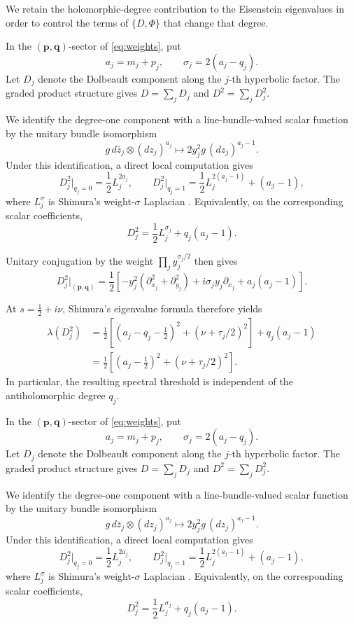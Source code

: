 \documentclass[11pt]{article}
\theoremstyle{definition}
\theoremstyle{plain}
\numberwithin{equation}{section}
\begin{document}
We retain the holomorphic-degree contribution to the Eisenstein
eigenvalues in order to control the terms of $\{D,\Phi\}$ that
change that degree.


In the $(\boldsymbol p,\boldsymbol q)$-sector of
\eqref{eq:weights}, put
\[
a_j=m_j+p_j,\qquad
\sigma_j=2(a_j-q_j).
\]
Let $D_j$ denote the Dolbeault component along the
$j$-th hyperbolic factor. The graded product structure
gives $D=\sum_jD_j$ and $D^2=\sum_jD_j^2$.

We identify the degree-one component with a
line-bundle-valued scalar function by the unitary
bundle isomorphism
\[
g\,d\bar z_j\otimes(dz_j)^{a_j}
\longmapsto
2y_j^2g\,(dz_j)^{a_j-1}.
\]
Under this identification, a direct local computation gives
\[
D_j^2\big|_{q_j=0}
=\frac12 L_j^{2a_j},
\qquad
D_j^2\big|_{q_j=1}
=\frac12 L_j^{2(a_j-1)}+(a_j-1),
\]
where $L_j^\sigma$ is Shimura's weight-$\sigma$
Laplacian \cite[(2.4)]{Shimura}.
Equivalently, on the corresponding scalar coefficients,
\[
D_j^2=\frac12 L_j^{\sigma_j}
       +q_j(a_j-1).
\]

Unitary conjugation by the weight
$\prod_j y_j^{\sigma_j/2}$ then gives
\begin{equation}\label{eq:dirac-laplacian}
D_j^2\big|_{(\boldsymbol p,\boldsymbol q)}
=\frac12\left[
-y_j^2(\partial_{x_j}^2+\partial_{y_j}^2)
+i\sigma_j y_j\partial_{x_j}
+a_j(a_j-1)
\right].
\end{equation}

At $s=\tfrac12+i\nu$, Shimura's eigenvalue formula
\cite[(4.2)]{Shimura} therefore yields
\[
\begin{aligned}
\lambda(D_j^2)
&=\frac12\left[
(a_j-q_j-\tfrac12)^2
+(\nu+\tau_j/2)^2
\right]+q_j(a_j-1)\\
&=\frac12\left[
(a_j-\tfrac12)^2
+(\nu+\tau_j/2)^2
\right].
\end{aligned}
\]
In particular, the resulting spectral threshold is
independent of the antiholomorphic degree $q_j$.

In the $(\boldsymbol p,\boldsymbol q)$-sector of
\eqref{eq:weights}, put
\[
a_j=m_j+p_j,\qquad
\sigma_j=2(a_j-q_j).
\]
Let $D_j$ denote the Dolbeault component along the
$j$-th hyperbolic factor. The graded product structure
gives $D=\sum_jD_j$ and $D^2=\sum_jD_j^2$.

We identify the degree-one component with a
line-bundle-valued scalar function by the unitary
bundle isomorphism
\[
g\,d\bar z_j\otimes(dz_j)^{a_j}
\longmapsto
2y_j^2g\,(dz_j)^{a_j-1}.
\]
Under this identification, a direct local computation gives
\[
D_j^2\big|_{q_j=0}
=\frac12 L_j^{2a_j},
\qquad
D_j^2\big|_{q_j=1}
=\frac12 L_j^{2(a_j-1)}+(a_j-1),
\]
where $L_j^\sigma$ is Shimura's weight-$\sigma$
Laplacian \cite[(2.4)]{Shimura}.
Equivalently, on the corresponding scalar coefficients,
\[
D_j^2=\frac12 L_j^{\sigma_j}
       +q_j(a_j-1).
\]
\end{document}
